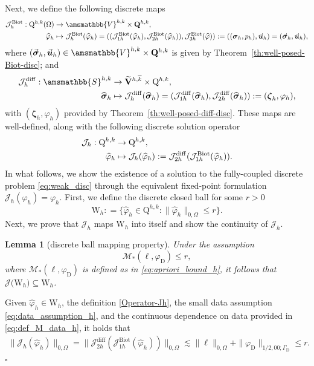 \documentclass[fleqn,a4paper]{cas-sc}
\newcommand{\bbS}{\amsmathbb{S}}
\newcommand{\bu}{\boldsymbol{u}}
\newcommand{\bzeta}{\boldsymbol{\zeta}}
\newcommand{\0}{\boldsymbol{0}}
\newcommand\cJ{\mathcal{J}}
\newcommand\bQ{\mathbf{Q}}
\newcommand\bV{\mathbf{V}}
\newcommand\rQ{\mathrm{Q}}
\newcommand\bbV{\amsmathbb{V}}
\newcommand\rW{\mathrm{W}}
\newcommand\bsigma{\boldsymbol{\sigma}}
\numberwithin{equation}{section}
\numberwithin{figure}{section}
\newtheorem{lemma}[theorem]{Lemma}
\newenvironment{proof}{\noindent{\it Proof.}}{\hfill$\square$}
\begin{document}
Next, we define the following discrete maps
\begin{align*}
    \cJ_h^{\mathrm{Biot}}:\rQ^{h,k}(\Omega)&\to \bbV^{h,k} \times \bQ^{h,k},\\
    \widehat{\varphi}_h &\mapsto \cJ_h^{\mathrm{Biot}}(\widehat{\varphi}_h)= ((\cJ^{\mathrm{Biot}}_{1h}(\widehat{\varphi}_h), \cJ^{\mathrm{Biot}}_{2h}(\widehat{\varphi}_h)),\cJ^{\mathrm{Biot}}_{3h}(\widehat{\varphi})):= ( (\bsigma_h, p_h),  \vec{\bu}_h)=( \vec{\bsigma}_h, \vec{\bu}_h),
\end{align*} 
where $( \vec{\bsigma}_h, \vec{\bu}_h) \in \bbV^{h,k} \times \bQ^{h,k}$ is given by Theorem~\ref{th:well-posed-Biot-disc}; and 
\begin{align*}
    \cJ_h^{\mathrm{diff}}: \bbS^{h,k} &\to \widetilde{\bV}^{h,\overline{k}} \times \rQ^{h,k}, \\
    \widehat{\bsigma}_h &\mapsto \cJ_h^{\mathrm{diff}}(\widehat{\bsigma}_h)=(\cJ^{\mathrm{diff}}_{1h}(\widehat{\bsigma}_h),\cJ^{\mathrm{diff}}_{2h}(\widehat{\bsigma}_h)):= (\bzeta_h,\varphi_h ),
\end{align*}
with $(\bzeta_h,\varphi_h)$ provided by Theorem~\ref{th:well-posed-diff-disc}. These maps are well-defined, along with the following discrete solution operator  
\begin{align}\label{Operator-Jh}
    \mathcal{J}_h: \rQ^{h,k}  &\to  \rQ^{h,k}, \notag \\
    \widehat{\varphi}_h &\mapsto \cJ_h(\widehat{\varphi}_h):= \cJ^{\mathrm{diff}}_{2h}(\cJ^{\mathrm{Biot}}_{1h}(\widehat{\varphi}_h)).
\end{align}
In what follows, we show {the existence of a solution to} the fully-coupled discrete problem \eqref{eq:weak_disc} through the equivalent fixed-point formulation $\cJ_h(\varphi_h)=\varphi_h$. First, we define the discrete closed ball for some $r>0$
\[ \rW_h : = \{ \widehat{\varphi}_h \in \rQ^{h,k}:
  \|\widehat{\varphi}_h\|_{0,\Omega}  \leq r \}.\]
Next, we prove that $\cJ_h$ maps $\rW_h$ into itself and show the continuity of {$\cJ_h$}.
{\begin{lemma}[discrete ball mapping property]\label{lemma:J-W-delta-W-delta-disc}
    Under the assumption 
    \begin{equation}\label{eq:data_assumption_h}
        \mathcal{M}_*(\ell, \varphi_{\mathrm{D}})\leq r,
    \end{equation}
    where $\mathcal{M}_*(\ell, \varphi_{\mathrm{D}})$ is defined as in \eqref{eq:apriori_bound_h}, it follows that  $\mathcal{J}\big(\rW_h\big)\subseteq\rW_h$.
\end{lemma}
\begin{proof}
  Given $\widehat{\varphi}_h \in \rW_h$, the definition \eqref{Operator-Jh}, the small data assumption \eqref{eq:data_assumption_h}, and the continuous dependence on data provided in \eqref{eq:def_M_data_h}, it holds that
     \begin{align*}
        \|\mathcal{J}_h(\widehat{\varphi}_h)\|_{0,\Omega}= \|  \cJ^{\mathrm{diff}}_{2h}(\cJ^{\mathrm{Biot}}_{1h}(\widehat{\varphi}_h))\|_{0,\Omega} \lesssim \|\ell \|_{0,\Omega} +  \|\varphi_{\mathrm{D}}\|_{1/2,00;\Gamma_{\mathrm{D}}} \leq r.
     \end{align*}
\end{proof}}
\end{document}
